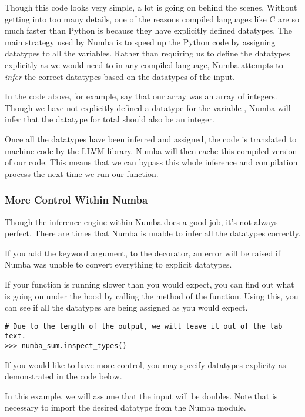 Though this code looks very simple, a lot is going on behind the scenes. Without getting into too many details, one of the reasons compiled languages like C are so much faster than Python is because they have explicitly defined datatypes. The main strategy used by Numba is to speed up the Python code by assigning datatypes to all the variables. Rather than requiring us to define the datatypes explicitly as we would need to in any compiled language, Numba attempts to \emph{infer} the correct datatypes based on the datatypes of the input.

In the code above, for example, say that our array  was an array of integers. Though we have not explicitly defined a datatype for the variable , Numba will infer that the datatype for total should also be an integer.

Once all the datatypes have been inferred and assigned, the code is translated to machine code by the LLVM library. Numba will then cache this compiled version of our code. This means that we can bypass this whole inference and compilation process the next time we run our function.

\subsubsection*{More Control Within Numba}
Though the inference engine within Numba does a good job, it's not always perfect. There are times that Numba is unable to infer all the datatypes correctly.

If you add the keyword argument,  to the  decorator, an error will be raised if Numba was unable to convert everything to explicit datatypes.

If your function is running slower than you would expect, you can find out what is going on under the hood by calling the  method of the function. Using this, you can see if all the datatypes are being assigned as you would expect.

\begin{lstlisting}
# Due to the length of the output, we will leave it out of the lab text.
>>> numba_sum.inspect_types()
\end{lstlisting}

If you would like to have more control, you may specify datatypes explicity as demonstrated in the code below.

In this example, we will assume that the input will be doubles. Note that is necessary to import the desired datatype from the Numba module.

